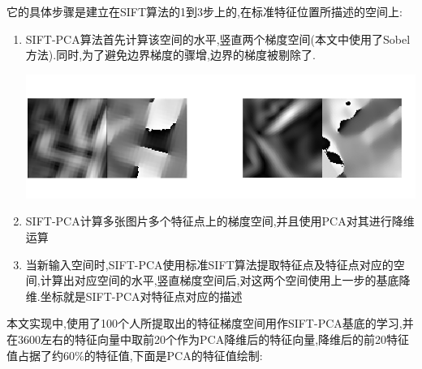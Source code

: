 	它的具体步骤是建立在SIFT算法的1到3步上的,在标准特征位置所描述的空间上:
	\begin{enumerate}
		\item SIFT-PCA算法首先计算该空间的水平,竖直两个梯度空间(本文中使用了Sobel方法).同时,为了避免边界梯度的骤增,边界的梯度被剔除了.
			
		\begin{center}
		\begin{minipage}[t]{\linewidth}
		\center
		{
		\includegraphics[width=\MyFactor\textwidth]{Img/c3/gradient.png} 
		\captionsetup{justification=centering}
		}
		\end{minipage}
		\medskip
		\end{center}
		
		\item SIFT-PCA计算多张图片多个特征点上的梯度空间,并且使用PCA对其进行降维运算
		\item 当新输入空间时,SIFT-PCA使用标准SIFT算法提取特征点及特征点对应的空间,计算出对应空间的水平,竖直梯度空间后,对这两个空间使用上一步的基底降维.坐标就是SIFT-PCA对特征点对应的描述
	\end{enumerate}
	本文实现中,使用了100个人所提取出的特征梯度空间用作SIFT-PCA基底的学习,并在3600左右的特征向量中取前20个作为PCA降维后的特征向量,降维后的前20特征值占据了约60\%的特征值,下面是PCA的特征值绘制:
	
